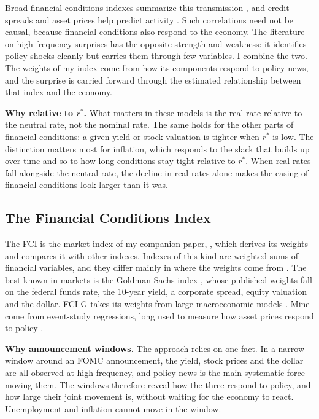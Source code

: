 \documentclass[11pt]{article}
\newcommand{\rs}{r^{*}}
\begin{document}
Broad financial conditions indexes summarize this transmission \citep{hatzius2010,brave2011,ajello2023}, and credit spreads and asset prices help predict activity \citep{gilchrist2012,stock2003}. Such correlations need not be causal, because financial conditions also respond to the economy. The literature on high-frequency surprises has the opposite strength and weakness: it identifies policy shocks cleanly but carries them through few variables. I combine the two. The weights of my index come from how its components respond to policy news, and the surprise is carried forward through the estimated relationship between that index and the economy.

\textbf{Why relative to $r^*$.} What matters in these models is the real rate relative to the neutral rate, not the nominal rate. The same holds for the other parts of financial conditions: a given yield or stock valuation is tighter when $\rs$ is low. The distinction matters most for inflation, which responds to the slack that builds up over time and so to how long conditions stay tight relative to $\rs$. When real rates fall alongside the neutral rate, the decline in real rates alone makes the easing of financial conditions look larger than it was.

\subsection{The Financial Conditions Index}\label{sec:measure}
The FCI is the market index of my companion paper, \citet{fcinote}, which derives its weights and compares it with other indexes. Indexes of this kind are weighted sums of financial variables, and they differ mainly in where the weights come from \citep{hatzius2010}. The best known in markets is the Goldman Sachs index \citep{dudley2000,hatzius2018}, whose published weights fall on the federal funds rate, the 10-year yield, a corporate spread, equity valuation and the dollar. FCI-G takes its weights from large macroeconomic models \citep{ajello2023}. Mine come from event-study regressions, long used to measure how asset prices respond to policy \citep{kuttner2001,bernanke2005,hanson2015,nakamura2018}.

\textbf{Why announcement windows.} The approach relies on one fact. In a narrow window around an FOMC announcement, the yield, stock prices and the dollar are all observed at high frequency, and policy news is the main systematic force moving them. The windows therefore reveal how the three respond to policy, and how large their joint movement is, without waiting for the economy to react. Unemployment and inflation cannot move in the window.
\end{document}

